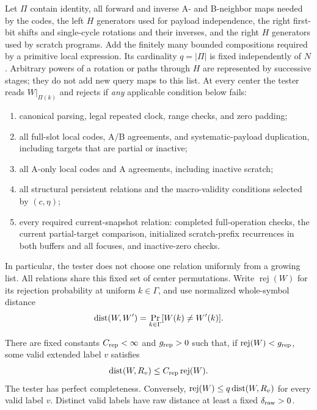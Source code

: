 Let $\Pi$ contain identity, all forward and inverse A- and B-neighbor
maps needed by the codes, the left $H$ generators used for payload
independence, the right first-bit shifts and single-cycle rotations and
their inverses, and the right $H$ generators used by scratch programs.
Add the finitely many bounded compositions required by a primitive local
expression. Its cardinality $q=|\Pi|$ is fixed independently of $N$.
Arbitrary powers of a rotation or paths through $H$ are represented by
successive stages; they do not add new query maps to this list. At every
center the tester reads $W|_{\Pi(k)}$ and rejects if \emph{any} applicable
condition below fails:
\begin{enumerate}[label=\textup{(\roman*)}]
\item canonical parsing, legal repeated clock, range checks, and zero
padding;
\item all full-slot local codes, A/B agreements, and systematic-payload
duplication, including targets that are partial or inactive;
\item all A-only local codes and A agreements, including inactive
scratch;
\item all structural persistent relations and the macro-validity
conditions selected by $(c,\eta)$;
\item every required current-snapshot relation: completed full-operation
checks, the current partial-target comparison, initialized scratch-prefix
recurrences in both buffers and all focuses, and inactive-zero checks.
\end{enumerate}
In particular, the tester does not choose one relation uniformly from a
growing list. All relations share this fixed set of center permutations.
Write $\operatorname{rej}(W)$ for its rejection probability at uniform
$k\in\Gamma$, and use normalized whole-symbol distance
\[
 \operatorname{dist}(W,W')=\Pr_{k\in\Gamma}[W(k)\ne W'(k)].
\]

\begin{lemma}\label{oe:valid-testing}
There are fixed constants $C_{\rm rep}<\infty$ and $g_{\rm rep}>0$
such that, if $\operatorname{rej}(W)<g_{\rm rep}$, some valid extended
label $v$ satisfies
\[
 \operatorname{dist}(W,R_v)\leq C_{\rm rep}\operatorname{rej}(W).
\]
The tester has perfect completeness. Conversely,
$\operatorname{rej}(W)\leq q\operatorname{dist}(W,R_v)$ for every valid label $v$.
Distinct valid labels have raw distance at least a fixed
$\delta_{\rm raw}>0$.
\end{lemma}

